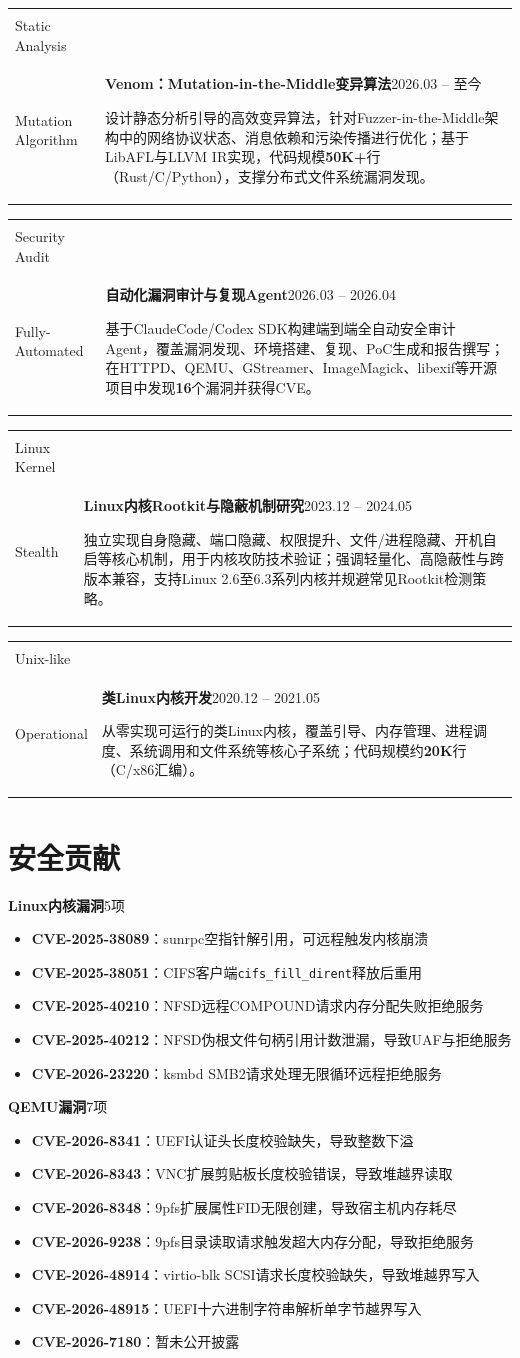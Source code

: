\documentclass[10pt, a4paper]{article}
\makeatletter
\newcommand{\resumeentry}[2]{%
  \noindent\textbf{#1}\hfill #2\par\vspace{1pt}
}
\newcommand{\sectionicon}[2]{%
  \section{\texorpdfstring{\textcolor{accent}{#1}\enspace #2}{#2}}%
}
\newcommand{\projectkeywords}[3]{%
  {\small\bfseries\color{sectioncolor}#1}\\[-1pt]
  {\footnotesize\color{accent}#2}\\[-1pt]
  {\footnotesize\color{accent}#3}%
}
\newcommand{\projectentry}[4]{%
  \par\addvspace{3pt}%
  \noindent
  \begin{tabularx}{\textwidth}{@{}p{1.12in}@{\hspace{0.10in}}>{\raggedright\arraybackslash}X@{}}
    {\begin{tabular}[t]{@{}l@{}}#3\end{tabular}} &
    {\textbf{#1}\hfill{\color{muted}#2}\par
     #4\par}%
  \end{tabularx}\par
}
\makeatother
\begin{document}
\projectentry
{Venom：Mutation-in-the-Middle变异算法}{2026.03 -- 至今}
{\projectkeywords{Fuzzing}{Static Analysis}{Mutation Algorithm}}
{设计静态分析引导的高效变异算法，针对Fuzzer-in-the-Middle架构中的网络协议状态、消息依赖和污染传播进行优化；基于LibAFL与LLVM IR实现，代码规模\textbf{50K+}行（Rust/C/Python），支撑分布式文件系统漏洞发现。}

\projectentry
{自动化漏洞审计与复现Agent}{2026.03 -- 2026.04}
{\projectkeywords{Agentic}{Security Audit}{Fully-Automated}}
{基于ClaudeCode/Codex SDK构建端到端全自动安全审计Agent，覆盖漏洞发现、环境搭建、复现、PoC生成和报告撰写；在HTTPD、QEMU、GStreamer、ImageMagick、libexif等开源项目中发现\textbf{16}个漏洞并获得CVE。}

\projectentry
{Linux内核Rootkit与隐蔽机制研究}{2023.12 -- 2024.05}
{\projectkeywords{Rootkit}{Linux Kernel}{Stealth}}
{独立实现自身隐藏、端口隐藏、权限提升、文件/进程隐藏、开机自启等核心机制，用于内核攻防技术验证；强调轻量化、高隐蔽性与跨版本兼容，支持Linux 2.6至6.3系列内核并规避常见Rootkit检测策略。}

\projectentry
{类Linux内核开发}{2020.12 -- 2021.05}
{\projectkeywords{Kernel Dev}{Unix-like}{Operational}}
{从零实现可运行的类Linux内核，覆盖引导、内存管理、进程调度、系统调用和文件系统等核心子系统；代码规模约\textbf{20K}行（C/x86汇编）。}

\sectionicon{}{安全贡献}

\resumeentry{Linux内核漏洞}{5项}

\begin{itemize}
  \item \textbf{CVE-2025-38089}：sunrpc空指针解引用，可远程触发内核崩溃
  \item \textbf{CVE-2025-38051}：CIFS客户端\texttt{cifs\_fill\_dirent}释放后重用
  \item \textbf{CVE-2025-40210}：NFSD远程COMPOUND请求内存分配失败拒绝服务
  \item \textbf{CVE-2025-40212}：NFSD伪根文件句柄引用计数泄漏，导致UAF与拒绝服务
  \item \textbf{CVE-2026-23220}：ksmbd SMB2请求处理无限循环远程拒绝服务
\end{itemize}

\vspace{2pt}

\resumeentry{QEMU漏洞}{7项}

\begin{itemize}
  \item \textbf{CVE-2026-8341}：UEFI认证头长度校验缺失，导致整数下溢
  \item \textbf{CVE-2026-8343}：VNC扩展剪贴板长度校验错误，导致堆越界读取
  \item \textbf{CVE-2026-8348}：9pfs扩展属性FID无限创建，导致宿主机内存耗尽
  \item \textbf{CVE-2026-9238}：9pfs目录读取请求触发超大内存分配，导致拒绝服务
  \item \textbf{CVE-2026-48914}：virtio-blk SCSI请求长度校验缺失，导致堆越界写入
  \item \textbf{CVE-2026-48915}：UEFI十六进制字符串解析单字节越界写入
  \item \textbf{CVE-2026-7180}：暂未公开披露
\end{itemize}
\end{document}
